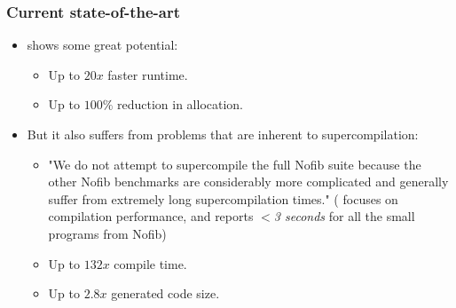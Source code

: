 \documentclass{beamer}
\begin{document}
\begin{frame}
    \frametitle{Current state-of-the-art}

    \begin{itemize}
        \item
            \citet{callbyneed-sc} shows some great potential:
            \begin{itemize}
                \item
                    Up to $20x$ faster runtime.
                \item
                    Up to $100\%$ reduction in allocation.
            \end{itemize}
        \item
            But it also suffers from problems that are inherent to
            supercompilation:
            \begin{itemize}
                \item
                    "We do not attempt to supercompile the full Nofib suite because the
                    other Nofib benchmarks are considerably more complicated and
                    generally suffer from extremely long supercompilation times."
                    \newline
                    (\citet{timeandspace} focuses on compilation performance,
                    and reports \textit{$<$3 seconds} for all the small programs
                    from Nofib)
                \item
                    Up to $132x$ compile time.
                \item
                    Up to $2.8x$ generated code size.
            \end{itemize}
    \end{itemize}
\end{frame}
\end{document}
